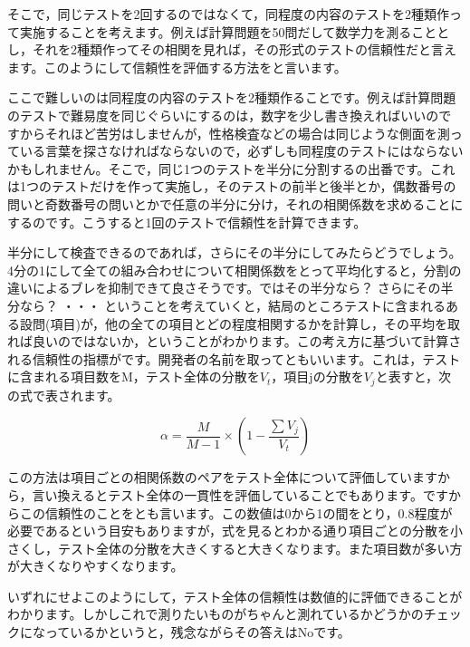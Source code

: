 \documentclass{ltjbook}
\begin{document}
そこで，同じテストを2回するのではなくて，同程度の内容のテストを2種類作って実施することを考えます。例えば計算問題を50問だして数学力を測ることとし，それを2種類作ってその相関を見れば，その形式のテストの信頼性だと言えます。このようにして信頼性を評価する方法をと言います。

ここで難しいのは同程度の内容のテストを2種類作ることです。例えば計算問題のテストで難易度を同じぐらいにするのは，数字を少し書き換えればいいのですからそれほど苦労はしませんが，性格検査などの場合は同じような側面を測っている言葉を探さなければならないので，必ずしも同程度のテストにはならないかもしれません。そこで，同じ1つのテストを半分に分割するの出番です。これは1つのテストだけを作って実施し，そのテストの前半と後半とか，偶数番号の問いと奇数番号の問いとかで任意の半分に分け，それの相関係数を求めることにするのです。こうすると1回のテストで信頼性を計算できます。

半分にして検査できるのであれば，さらにその半分にしてみたらどうでしょう。4分の1にして全ての組み合わせについて相関係数をとって平均化すると，分割の違いによるブレを抑制できて良さそうです。ではその半分なら？ さらにその半分なら？ ・・・
ということを考えていくと，結局のところテストに含まれるある設問(項目)が，他の全ての項目とどの程度相関するかを計算し，その平均を取れば良いのではないか，ということがわかります。この考え方に基づいて計算される信頼性の指標がです。開発者の名前を取ってともいいます。これは，テストに含まれる項目数をM，テスト全体の分散を$V_t$，項目jの分散を$V_j$と表すと，次の式で表されます。

\[  \alpha =   \frac{M}{M-1} \times \left(1-\frac{\sum V_j}{V_t} \right) \]

この方法は項目ごとの相関係数のペアをテスト全体について評価していますから，言い換えるとテスト全体の一貫性を評価していることでもあります。ですからこの信頼性のことをとも言います。この数値は0から1の間をとり，0.8程度が必要であるという目安もありますが，式を見るとわかる通り項目ごとの分散を小さくし，テスト全体の分散を大きくすると大きくなります。また項目数が多い方が大きくなりやすくなります。

いずれにせよこのようにして，テスト全体の信頼性は数値的に評価できることがわかります。しかしこれで測りたいものがちゃんと測れているかどうかのチェックになっているかというと，残念ながらその答えはNoです。
\end{document}
